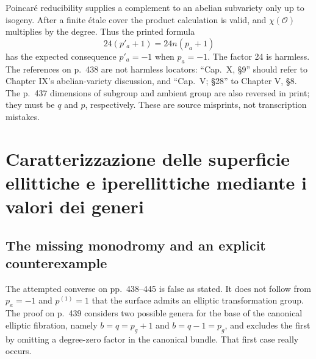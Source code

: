Poincar\'e reducibility supplies a complement to an abelian subvariety only up to isogeny. After a finite \'etale cover the product calculation is valid, and \(\chi(\mathcal O)\) multiplies by the degree. Thus the printed formula
\[
24(p'_a+1)=24n(p_a+1)
\]
has the expected consequence \(p'_a=-1\) when \(p_a=-1\). The factor 24 is harmless. The references on p.~438 are not harmless locators: ``Cap.~X, \S9'' should refer to Chapter IX's abelian-variety discussion, and ``Cap.~V; \S28'' to Chapter V, \S8. The p.~437 dimensions of subgroup and ambient group are also reversed in print; they must be \(q\) and \(p\), respectively. These are source misprints, not transcription mistakes.

\section[Caratterizzazione mediante i generi]{Caratterizzazione delle superficie ellittiche e iperellittiche mediante i valori dei generi}
\label{cp2-xi-4}

\subsection{The missing monodromy and an explicit counterexample}

The attempted converse on pp.~438--445 is false as stated. It does not follow from \(p_a=-1\) and \(p^{(1)}=1\) that the surface admits an elliptic transformation group. The proof on p.~439 considers two possible genera for the base of the canonical elliptic fibration, namely \(b=q=p_g+1\) and \(b=q-1=p_g\), and excludes the first by omitting a degree-zero factor in the canonical bundle. That first case really occurs.

